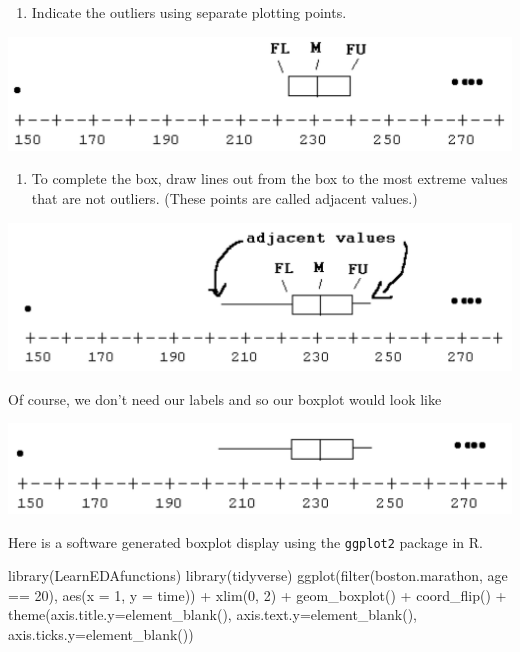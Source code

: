 \documentclass[
]{book}
\newenvironment{Shaded}{\begin{snugshade}}{\end{snugshade}}
\newcommand{\AttributeTok}[1]{\textcolor[rgb]{0.77,0.63,0.00}{#1}}
\newcommand{\DecValTok}[1]{\textcolor[rgb]{0.00,0.00,0.81}{#1}}
\newcommand{\FunctionTok}[1]{\textcolor[rgb]{0.00,0.00,0.00}{#1}}
\newcommand{\NormalTok}[1]{#1}
\newcommand{\SpecialCharTok}[1]{\textcolor[rgb]{0.00,0.00,0.00}{#1}}
\providecommand{\tightlist}{%
  \setlength{\itemsep}{0pt}\setlength{\parskip}{0pt}}
\begin{document}
\begin{enumerate}
\def\labelenumi{\arabic{enumi}.}
\setcounter{enumi}{2}
\tightlist
\item
  Indicate the outliers using separate plotting points.
\end{enumerate}

\includegraphics[width=0.8\linewidth]{figures/comparison/boxplot3}

\begin{enumerate}
\def\labelenumi{\arabic{enumi}.}
\setcounter{enumi}{3}
\tightlist
\item
  To complete the box, draw lines out from the box to the most extreme values that are not outliers. (These points are called adjacent values.)
\end{enumerate}

\includegraphics[width=0.8\linewidth]{figures/comparison/boxplot4}

Of course, we don't need our labels and so our boxplot would look like

\includegraphics[width=0.8\linewidth]{figures/comparison/boxplot5}

Here is a software generated boxplot display using the \texttt{ggplot2} package in R.

\begin{Shaded}
\begin{Highlighting}[]
\FunctionTok{library}\NormalTok{(LearnEDAfunctions)}
\FunctionTok{library}\NormalTok{(tidyverse)}
\FunctionTok{ggplot}\NormalTok{(}\FunctionTok{filter}\NormalTok{(boston.marathon, age }\SpecialCharTok{==} \DecValTok{20}\NormalTok{),}
       \FunctionTok{aes}\NormalTok{(}\AttributeTok{x =} \DecValTok{1}\NormalTok{, }\AttributeTok{y =}\NormalTok{ time)) }\SpecialCharTok{+} \FunctionTok{xlim}\NormalTok{(}\DecValTok{0}\NormalTok{, }\DecValTok{2}\NormalTok{) }\SpecialCharTok{+}
  \FunctionTok{geom\_boxplot}\NormalTok{() }\SpecialCharTok{+} \FunctionTok{coord\_flip}\NormalTok{() }\SpecialCharTok{+} 
  \FunctionTok{theme}\NormalTok{(}\AttributeTok{axis.title.y=}\FunctionTok{element\_blank}\NormalTok{(),}
        \AttributeTok{axis.text.y=}\FunctionTok{element\_blank}\NormalTok{(),}
        \AttributeTok{axis.ticks.y=}\FunctionTok{element\_blank}\NormalTok{())}
\end{Highlighting}
\end{Shaded}
\end{document}
